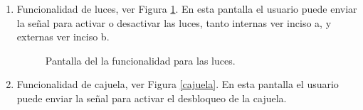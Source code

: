 \begin{enumerate}
\item Funcionalidad de luces, ver Figura \ref{luces}. En esta pantalla el usuario puede enviar la señal para activar o desactivar las luces, tanto internas ver inciso a, y externas ver inciso b.

\begin{figure}[H]
\centering
{}\hspace{5mm}
\hspace{5mm}
\caption{Pantalla del la funcionalidad para las luces.}
\label{luces}
\end{figure}

\item Funcionalidad de cajuela, ver Figura \ref{cajuela}. En esta pantalla el usuario puede enviar la señal para activar el desbloqueo de la cajuela.


\end{enumerate}
